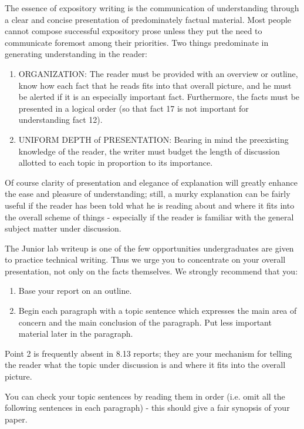 The essence of expository writing is the communication of
understanding through a clear and concise presentation of
predominately factual material. Most people cannot compose
successful expository prose unless they put the need to communicate
foremost among their priorities. Two things predominate in
generating understanding in the reader:
\begin{enumerate}
\item ORGANIZATION: The reader must be provided with an overview or
outline, know how each fact that he reads fits into that overall
picture, and he must be alerted if it is an especially important
fact. Furthermore, the facts must be presented in a logical order
(so that fact 17 is not important for understanding fact 12).

\item UNIFORM DEPTH of PRESENTATION: Bearing in mind the preexisting
knowledge of the reader, the writer must budget the length of
discussion allotted to each topic in proportion to its importance.

\end{enumerate}

Of course clarity of presentation and elegance of explanation will
greatly enhance the ease and pleasure of understanding; still, a
murky explanation can be fairly useful if the reader has been told
what he is reading about and where it fits into the overall scheme
of things - especially if the reader is familiar with the general
subject matter under discussion.

The Junior lab writeup is one of the few opportunities
undergraduates are given to practice technical writing. Thus we urge
you to concentrate on your overall presentation, not only on the
facts themselves. We strongly recommend that you:
\begin{enumerate}
\item Base your report on an outline.
\item Begin each paragraph with a topic sentence which expresses the
main area of concern and the main conclusion of the paragraph. Put
less important material later in the paragraph.
\end{enumerate}

Point 2 is frequently absent in 8.13 reports; they are your
mechanism for telling the reader what the topic under discussion is
and where it fits into the overall picture.

You can check your topic sentences by reading them in order (i.e.
omit all the following sentences in each paragraph) - this should
give a fair synopsis of your paper.

